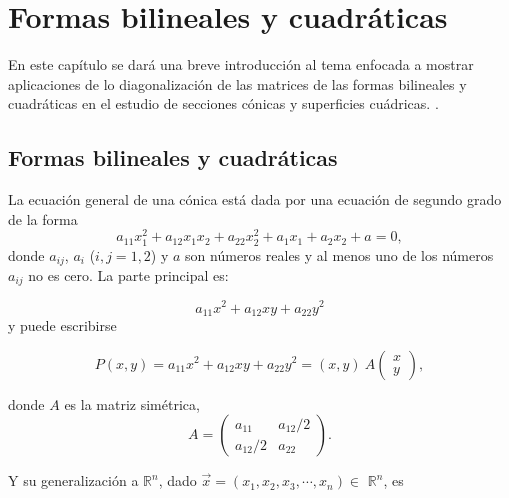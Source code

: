 \chapter{Formas bilineales y cuadráticas}

En este capítulo  se dará una breve introducción al tema enfocada a
mostrar  aplicaciones de lo diagonalización de las matrices de las formas bilineales y cuadráticas  en el estudio  de secciones cónicas y superficies cuádricas. . 




\section{Formas bilineales y cuadráticas}

La ecuación general de una cónica está dada por una ecuación de segundo grado de la forma
\begin{equation}
a_{11}x_1^{2}+a_{12}x_1x_2+a_{22}x_2^{2}+ a_1 x_1 + a_2 x_2 + a = 0, \label{fcuadratica0}
\end{equation}
donde $a_{ij}$, $a_i$ ($i,j=1,2$) y $a$ son números reales  y al menos uno de los números $a_{ij}$ no es cero.
La parte principal es:



\begin{equation}
a_{11}x^{2}+a_{12}xy+a_{22}y^{2}
\end{equation}
\noindent
y puede escribirse

\begin{equation}
P(x,y)=a_{11}x^{2}+a_{12}xy+a_{22}y^{2}=(x, y) ~A \left(\begin{array}{c} x \\  y 
 \end{array}\right), \label{fcuadratica01}
\end{equation}


\bigskip
\noindent
donde $A$ es la matriz simétrica,
\begin{equation}
A= \left(\begin{array}{cc} a_{11} & a_{12}/2  \\a_{12}/2 & a_{22}
\end{array}
 \right). \label{fcmatriz}
\end{equation}

\bigskip



Y su generalización a $\mathbb{R}^{n}$, dado $\vec{x}=(x_1, x_2, x_3, \cdots, x_n) \in$ $\mathbb{R}^{n}$, es 



